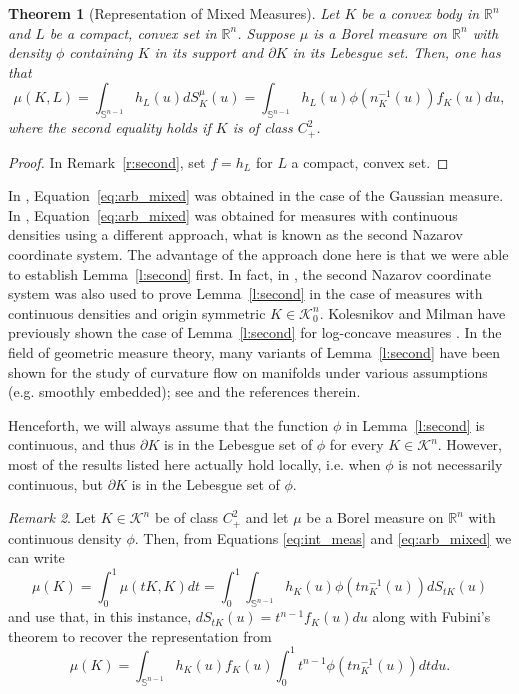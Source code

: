 \documentclass[11pt]{amsart}
\newtheorem{theorem}{Theorem}[section]
\theoremstyle{definition}
\theoremstyle{remark}
\newtheorem{remark}[theorem]{Remark}
\numberwithin{equation}{section}
\newcommand{\R}{\mathbb{R}}
\newcommand{\s}{\mathbb{S}}
\newcommand{\conbod}{\mathcal{K}^n}
\begin{document}
	\begin{theorem}[Representation of Mixed Measures]
	Let $K$ be a convex body in $\R^n$ and $L$ be a compact, convex set in $\R^n$. Suppose $\mu$ is a Borel measure on $\R^n$ with density $\phi$ containing $K$ in its support and $\partial K$ in its Lebesgue set. Then, one has that
	\begin{equation}
	    \mu(K,L)=\int_{\s^{n-1}}h_L(u)dS^{\mu}_{K}(u)=\int_{\s^{n-1}}h_L(u)\phi(n_K^{-1}(u))f_K(u)du,
	    \label{eq:arb_mixed}
	\end{equation}
	where the second equality holds if $K$ is of class $C^2_+$.
	\end{theorem}
	\begin{proof}
	In Remark~\ref{r:second}, set $f=h_L$ for $L$ a compact, convex set.
	\end{proof}
    In \cite{MR15}, Equation~\ref{eq:arb_mixed} was obtained in the case of the Gaussian measure. In \cite{GAL19}, Equation~\ref{eq:arb_mixed} was obtained for measures with continuous densities using a different approach, what is known as the second Nazarov coordinate system. The advantage of the approach done here is that we were able to establish Lemma~\ref{l:second} first. In fact, in \cite{HKL21}, the second Nazarov coordinate system was also used to prove Lemma~\ref{l:second} in the case of measures with continuous densities and origin symmetric $K\in\conbod_0$. Kolesnikov and Milman have previously shown the case of Lemma~\ref{l:second} for log-concave measures \cite{KM18}. In the field of geometric measure theory, many variants of Lemma~\ref{l:second} have been shown for the study of curvature flow on manifolds under various assumptions (e.g. smoothly embedded); see \cite{CM12} and the references therein.
    
    Henceforth, we will always assume that the function $\phi$ in Lemma~\ref{l:second} is continuous, and thus $\partial K$ is in the Lebesgue set of $\phi$ for every $K\in\conbod$. However, most of the results listed here actually hold locally, i.e. when $\phi$ is not necessarily continuous, but $\partial K$ is in the Lebesgue set of $\phi$.
	
	\begin{remark}
	Let $K\in\conbod$ be of class $C^2_+$ and let $\mu$ be a Borel measure on $\R^n$ with continuous density $\phi$. Then, from Equations \ref{eq:int_meas} and \ref{eq:arb_mixed} 
	we can write
$$\mu(K)=\int_{0}^1\mu(tK,K)dt=\int_0^1\int_{\s^{n-1}}h_K(u)\phi(tn^{-1}_K(u))dS_{tK}(u)$$
and use that, in this instance, $dS_{tK}(u)=t^{n-1}f_K(u)du$ along with Fubini's theorem to recover the representation from \cite{CLM17,KL21,GAL19}
\begin{equation}
\mu(K)=\int_{\s^{n-1}}h_K(u)f_K(u)\int_{0}^1 t^{n-1}\phi(tn^{-1}_K(u))dtdu.
\label{eq:meas_int}
\end{equation}
\end{remark}
\end{document}
